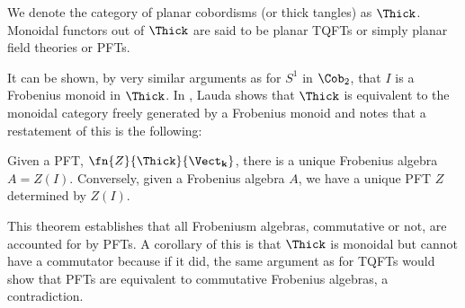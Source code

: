 \begin{defn}
We denote the category of planar cobordisms (or thick tangles) as $\Thick$.
Monoidal functors out of $\Thick$ are said to be planar TQFTs or simply planar
field theories or PFTs.
\end{defn}

It can be shown, by very similar arguments as for $S^1$ in $\Cob_2$, that $I$ is
a Frobenius monoid in $\Thick$. In \cite{NonCommTQFT}, Lauda shows that $\Thick$
is equivalent to the monoidal category freely generated by a Frobenius monoid
and notes that a restatement of this is the following:

\begin{thm}
Given a PFT, $\fn{Z}{\Thick}{\Vect_{\mathbf{k}}}$, there is a unique Frobenius
algebra $A = Z(I)$. Conversely, given a Frobenius algebra $A$, we have a unique
PFT $Z$ determined by $Z(I)$.
\end{thm}

This theorem establishes that all Frobeniusm algebras, commutative or not, are
accounted for by PFTs. A corollary of this is that $\Thick$ is monoidal but
cannot have a commutator because if it did, the same argument as for TQFTs would
show that PFTs are equivalent to commutative Frobenius algebras, a
contradiction.

